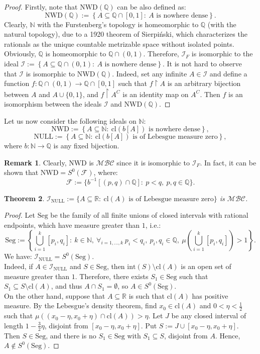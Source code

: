 \documentclass{amsart}
\newtheorem{thm}{Theorem}[section]
\theoremstyle{definition}
\newtheorem{remark}[thm]{Remark}
\newcommand{\N}{{\mathbb N}}
\newcommand{\R}{{\mathbb R}}
\newcommand{\Q}{{\mathbb Q}}
\newcommand{\I}{\mathcal I}
\newcommand{\MB}{S^0}
\newcommand{\MBC}{\mathcal{MBC}}
\newcommand{\Seg}{\mathrm{Seg}}
\newcommand{\NULL}{\mathrm{NULL}}
\newcommand{\NWD}{\mathrm{NWD}}
\newcommand{\INULL}{\I_\mathrm{NULL}}
\newcommand{\cl}{\mathrm{cl}}
\newcommand{\interior}{\mathrm{int}}
\begin{document}
\begin{proof}
Firstly, note that $\NWD(\Q)$ can be also defined as:
$$\NWD(\Q) := \left\{A\subseteq\mathbb{Q}\cap [0,1] :\ A \textrm{ is nowhere dense}\right\}.$$
Clearly, $\N$ with the Furstenberg's topology is homeomorphic to $\Q$ (with the natural topology), due to a 1920 theorem of Sierpi\'nski, which characterizes the rationals as the unique countable metrizable space without isolated points. Obviously, $\Q$ is homeomorphic to $\Q\cap (0,1)$. Therefore, $\I_F$ is isomorphic to the ideal $\I := \left\{A\subseteq\Q\cap (0,1) :\ A \textrm{ is nowhere dense}\right\}$. It is not hard to observe that $\I$ is isomorphic to $\NWD(\Q)$. Indeed, set any infinite $A\in\I$ and define a function $f \colon \Q\cap (0,1) \to \Q\cap [0,1]$ such that $f\upharpoonright A$ is an arbitrary bijection between $A$ and $A\cup\{0,1\}$, and $f\upharpoonright A^C$ is an identity map on $A^C$. Then $f$ is an isomorphism between the ideals $\I$ and $\NWD(\Q)$.
\end{proof}

Let us now consider the following ideals on $\N$:
$$\NWD :=\left\{A\subseteq\N :\ \cl(b[A]) \textrm{ is nowhere dense}\right\},$$
$$\NULL :=\left\{A\subseteq\N :\ \cl(b[A]) \textrm{ is of Lebesgue measure zero}\right\},$$
where $b\colon\N\to\Q$ is any fixed bijection.

\begin{remark}
Clearly, $\NWD$ is $\MBC$ since it is isomorphic to $\I_F$. In fact, it can be shown that $\NWD = \MB(\mathcal{F})$, where:
$$\mathcal{F} := \{b^{-1}[(p, q)\cap\Q] :\ p < q,\ p, q \in \Q\}.$$
\end{remark}

\begin{thm}
$\INULL := \{A \subseteq\R :\ \cl(A) \textrm{ is of Lebesgue measure zero}\}$ is $\MBC$.
\end{thm}

\begin{proof}
Let $\Seg$ be the family of all finite unions of closed intervals with rational endpoints, which have measure greater than $1$, i.e.:
$$\Seg := \left\{\bigcup_{i=1}^{k}{[p_i,q_i]} :\ k\in\N,\ \forall_{i=1,\ldots,k}\ p_i<q_i,\ p_i,q_i\in\Q,\ \mu\left(\bigcup_{i=1}^{k}{[p_i,q_i]}\right)>1\right\}.$$
We have: $\INULL = \MB(\Seg)$.\\
Indeed, if $A \in \INULL$ and $S\in\Seg$, then $\interior(S) \setminus \cl(A)$ is an open set of measure greater than $1$. Therefore, there exists $S_1\in \Seg$ such that $S_1 \subseteq S \setminus \cl(A)$, and thus $A \cap S_1 =\emptyset$, so $A\in\MB(\Seg)$.\\
On the other hand, suppose that $A\subseteq \R$ is such that $\cl(A)$ has positive measure. By the Lebesgue's density theorem, find $x_0\in\cl(A)$ and $0 < \eta < \frac{1}{2}$ such that $\mu((x_0-\eta, x_0+\eta) \cap \cl(A)) > \eta$. Let $J$ be any closed interval of length $1 - \frac{3}{2}\eta$, disjoint from $[x_0-\eta, x_0+\eta]$. Put $S := J \cup [x_0-\eta, x_0+\eta]$. Then $S\in\Seg$, and there is no $S_1\in\Seg$ with $S_1 \subseteq S$, disjoint from $A$. Hence, $A\notin\MB(\Seg)$.
\end{proof}
\end{document}
